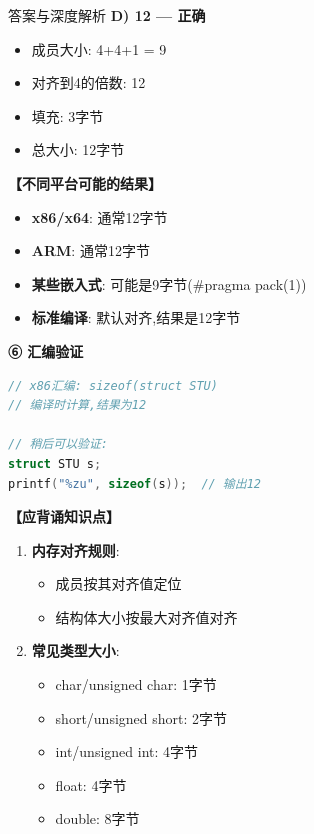 \documentclass[a4paper,12pt]{article}
\begin{document}
\begin{enumerate}
\begin{bluebox}{答案与深度解析}
	\textbf{D) 12 — 正确}
	\begin{itemize}[leftmargin=*, nosep]
		\item 成员大小: 4+4+1 = 9
		\item 对齐到4的倍数: 12
		\item 填充: 3字节
		\item 总大小: 12字节
	\end{itemize}

	\textbf{【不同平台可能的结果】}

	\begin{itemize}[leftmargin=*, nosep]
		\item \textbf{x86/x64}: 通常12字节
		\item \textbf{ARM}: 通常12字节
		\item \textbf{某些嵌入式}: 可能是9字节(#pragma pack(1))
		\item \textbf{标准编译}: 默认对齐,结果是12字节
	\end{itemize}

	\textbf{⑥ 汇编验证}
	\begin{lstlisting}[language=C]
// x86汇编: sizeof(struct STU)
// 编译时计算,结果为12

// 稍后可以验证:
struct STU s;
printf("%zu", sizeof(s));  // 输出12
    \end{lstlisting}

	\textbf{【应背诵知识点】}

	\begin{enumerate}[leftmargin=*, nosep]
		\item \textbf{内存对齐规则}:
		      \begin{itemize}
			      \item 成员按其对齐值定位
			      \item 结构体大小按最大对齐值对齐
		      \end{itemize}

		\item \textbf{常见类型大小}:
		      \begin{itemize}
			      \item char/unsigned char: 1字节
			      \item short/unsigned short: 2字节
			      \item int/unsigned int: 4字节
			      \item float: 4字节
			      \item double: 8字节
		      \end{itemize}


\end{enumerate}
\end{bluebox}
\end{enumerate}
\end{document}
